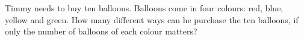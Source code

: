Timmy needs to buy ten balloons. Balloons come in four colours: red, blue, yellow and green. How many different ways can he purchase the ten balloons, if only the number of balloons of each colour matters?
